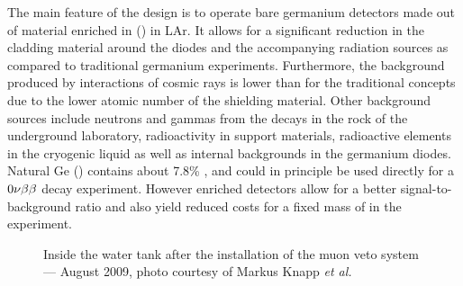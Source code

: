  The main feature of the {\gerda} design is to operate bare germanium detectors made out of material enriched in  () in LAr. It allows for a significant reduction in the cladding material around the diodes and the accompanying radiation sources as compared to traditional germanium experiments. Furthermore, the background produced by interactions of cosmic rays is lower than for the traditional concepts due to the lower atomic number of the shielding material. Other background sources include neutrons and gammas from the decays in the rock of the underground laboratory, radioactivity in support materials, radioactive elements in the cryogenic liquid as well as internal backgrounds in the germanium diodes. Natural Ge () contains about 7.8\% , and could in principle be used directly for a $0\nu\beta\beta$ decay experiment. However enriched detectors allow for a better signal-to-background ratio and also yield reduced costs for a fixed mass of  in the experiment.
\begin{figure}
	\centering
	\caption{Inside the water tank after the installation of the muon veto system --- August 2009, photo courtesy of Markus Knapp \emph{et al.}}\label{fig:muonveto}
\end{figure}
